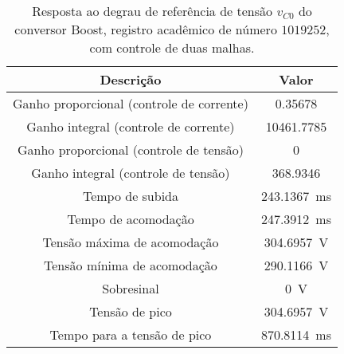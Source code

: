 \begin{table}[!ht]
\centering
\caption{Resposta ao degrau de referência de tensão $v_{C0}$ do conversor Boost, registro acadêmico de número $1019252$, com controle de duas malhas.}
\label{tab:resposta2malhas}
\begin{tabular}{@{}cc@{}}
\toprule
\textbf{Descrição} & \textbf{Valor}\\ \midrule
Ganho proporcional (controle de corrente) & \SI{0.35678}{}\\
Ganho integral (controle de corrente) & \SI{10461.7785}{}\\
Ganho proporcional (controle de tensão) & \SI{0}{}\\
Ganho integral (controle de tensão) & \SI{368.9346}{}\\
Tempo de subida & \SI{243.1367}{\milli\s}\\
Tempo de acomodação & \SI{247.3912}{\milli\s}\\
Tensão máxima de acomodação & \SI{304.6957}{\V}\\
Tensão mínima de acomodação & \SI{290.1166}{\V}\\
Sobresinal & \SI{0}{\V}\\
Tensão de pico & \SI{304.6957}{\V}\\
Tempo para a tensão de pico & \SI{870.8114}{\milli\s}\\
\bottomrule
\end{tabular}
\end{table}


